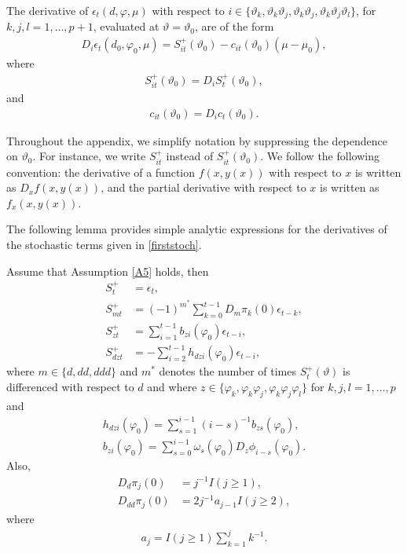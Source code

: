 {{The derivative of $\epsilon_t(d, \varphi, \mu)$ with respect to $i \in \{\vartheta_k,\vartheta_k \vartheta_j, \vartheta_k \vartheta_j,\vartheta_k \vartheta_j \vartheta_l \}$, for $k, j, l = 1,\ldots, p+1$, evaluated at $\vartheta = \vartheta_0$, are of the form 
\begin{align}
    D_{i}  \epsilon_t(d_0, \varphi_0, \mu) =  S^+_{i t}(\vartheta_0)  - c_{ i t}(\vartheta_0)\left( \mu - \mu_0 \right), \label{firstd1}
\end{align}
where 
\begin{align}
     S^+_{i t}(\vartheta_0) = D_{i} S^+_t(\vartheta_0), \label{firststoch}
\end{align}
and
\begin{align}
    c_{ i t}(\vartheta_0) = D_{i}  c_{t}(\vartheta_0).  \label{firstdet} 
\end{align}    

Throughout the appendix, we simplify notation by suppressing the dependence on $\vartheta_0$. For instance, we write $S^+_{i t}$ instead of $S^+_{i t}(\vartheta_0)$. We follow the following convention: the derivative of a function $f(x, y(x))$ with respect to $x$ is written as $D_x f(x, y(x))$, and the partial derivative with respect to $x$ is written as $f_x(x, y(x))$.

The following lemma provides simple analytic expressions for the derivatives of the stochastic terms given in \eqref{firststoch}.
\begin{lemma} \label{explicitforms} Assume that Assumption \ref{A5} holds, then 
    \begin{align}
        S_t^+ &= \epsilon_t, \label{exp0}\\
        S^+_{m t} &= (-1)^{m^*} \sum_{k = 0}^{t-1} D_m \pi_{k}(0) \epsilon_{t-k},  \label{exp1}\\
        S^+_{z t} &= \sum_{i = 1}^{t-1} b_{zi}(\varphi_0)  \epsilon_{t-i},\label{exp2} \\
        S^+_{ d z  t} &= -\sum_{i = 2}^{t-1} h_{dzi}(\varphi_0)  \epsilon_{t-i},\label{exp5} 
    \end{align}
    where $m \in \{d,dd,ddd \}$ and $m^*$ denotes the number of times $S^+_t(\vartheta)$ is differenced with respect to $d$ and where $z \in \{ \varphi_k, \varphi_k \varphi_j, \varphi_k \varphi_j \varphi_l \}$ for $k,j,l = 1,\ldots,p$ and 
    \begin{align}
        h_{dzi}(\varphi_0) = \sum_{s = 1}^{i-1} (i-s)^{-1} b_{zs}(\varphi_0), \label{defh} \\
        b_{zi}(\varphi_0) = \sum_{s = 0}^{i-1} \omega_s(\varphi_0) D_{z} \phi_{i-s}(\varphi_0). \label{defb}
    \end{align}
    Also,
    \begin{align}
        D_d \pi_j(0) &= j^{-1} I(j \geq 1), \label{dpi1} \\
        D_{dd} \pi_j(0) &= 2j^{-1} a_{j-1} I(j \geq 2), \label{dpi2}
    \end{align}
    where 
    \begin{align}
        a_j = I(j \geq 1) \sum_{k = 1}^j k^{-1}.
    \end{align}
\end{lemma}

}}
